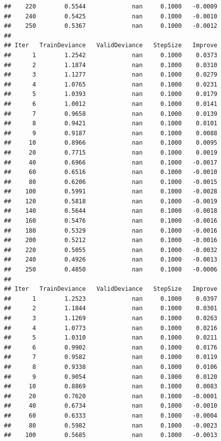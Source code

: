 \documentclass[
]{book}
\begin{document}
\begin{verbatim}
##    220        0.5544             nan     0.1000   -0.0009
##    240        0.5425             nan     0.1000   -0.0010
##    250        0.5367             nan     0.1000   -0.0012
## 
## Iter   TrainDeviance   ValidDeviance   StepSize   Improve
##      1        1.2542             nan     0.1000    0.0373
##      2        1.1874             nan     0.1000    0.0310
##      3        1.1277             nan     0.1000    0.0279
##      4        1.0765             nan     0.1000    0.0231
##      5        1.0393             nan     0.1000    0.0179
##      6        1.0012             nan     0.1000    0.0141
##      7        0.9658             nan     0.1000    0.0139
##      8        0.9421             nan     0.1000    0.0101
##      9        0.9187             nan     0.1000    0.0088
##     10        0.8966             nan     0.1000    0.0095
##     20        0.7715             nan     0.1000    0.0019
##     40        0.6966             nan     0.1000   -0.0017
##     60        0.6516             nan     0.1000   -0.0010
##     80        0.6206             nan     0.1000   -0.0015
##    100        0.5991             nan     0.1000   -0.0028
##    120        0.5818             nan     0.1000   -0.0019
##    140        0.5644             nan     0.1000   -0.0018
##    160        0.5476             nan     0.1000   -0.0016
##    180        0.5329             nan     0.1000   -0.0016
##    200        0.5212             nan     0.1000   -0.0016
##    220        0.5055             nan     0.1000   -0.0032
##    240        0.4926             nan     0.1000   -0.0013
##    250        0.4850             nan     0.1000   -0.0006
## 
## Iter   TrainDeviance   ValidDeviance   StepSize   Improve
##      1        1.2523             nan     0.1000    0.0397
##      2        1.1844             nan     0.1000    0.0301
##      3        1.1269             nan     0.1000    0.0263
##      4        1.0773             nan     0.1000    0.0216
##      5        1.0310             nan     0.1000    0.0211
##      6        0.9902             nan     0.1000    0.0176
##      7        0.9582             nan     0.1000    0.0119
##      8        0.9338             nan     0.1000    0.0106
##      9        0.9054             nan     0.1000    0.0120
##     10        0.8869             nan     0.1000    0.0083
##     20        0.7620             nan     0.1000   -0.0001
##     40        0.6734             nan     0.1000   -0.0010
##     60        0.6333             nan     0.1000   -0.0004
##     80        0.5982             nan     0.1000   -0.0023
##    100        0.5685             nan     0.1000   -0.0013

\end{verbatim}
\end{document}
